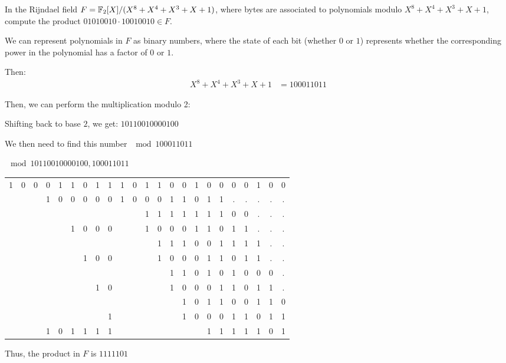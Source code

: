 \begin{problem}
In the Rijndael field $F=\mathbb{F}_2[X]/(X^8+X^4+X^3+X+1)$,
where bytes are associated to polynomials modulo $X^8+X^4+X^3+X+1$,
compute the product $01010010 \cdot 10010010 \in F$.
\end{problem}

\begin{Answer}

We can represent polynomials in $F$ as binary numbers,
where the state of each bit (whether $0$ or $1$) represents whether the
corresponding power in the polynomial has a factor of $0$ or $1$.

\noindent
Then:
\begin{align*}
  X^8+X^4+X^3+X+1 &= 100011011
\end{align*}

\noindent
Then, we can perform the multiplication modulo 2:
\bigskip
\center{}

\flushleft{}
Shifting back to base $2$, we get:
$1 0 1 1 0 0 1 0 0 0 0 1 0 0$

\noindent
We then need to find this number $\mod 100011011$

\center{}
$\mod{1 0 1 1 0 0 1 0 0 0 0 1 0 0},{1 0 0 0 1 1 0 1 1}$

\begin{tabular}{c@{\,}c@{\,}c@{\,}c@{\,}c@{\,}c@{\,}c@{\,}c@{\,}c@{\,}|c@{\,}c@{\,}c@{\,}c@{\,}c@{\,}c@{\,}c@{\,}c@{\,}c@{\,}c@{\,}c@{\,}c@{\,}c@{\,}c@{\,}}
  1 & 0 & 0 & 0 & 1 & 1 & 0 & 1 & 1    & 1 & 0 & 1 & 1 & 0 & 0 & 1 & 0 & 0 & 0 & 0 & 1 & 0 & 0\\
    &   &   & 1 & 0 & 0 & 0 & 0 & 0    & 1 & 0 & 0 & 0 & 1 & 1 & 0 & 1 & 1 &.  &.  &.  &.  &. \\
    &   &   &   &   &   &   &   &      &   &   & 1 & 1 & 1 & 1 & 1 & 1 & 1 & 0 & 0 &.  &.  &. \\
    &   &   &   &   & 1 & 0 & 0 & 0    &   &   & 1 & 0 & 0 & 0 & 1 & 1 & 0 & 1 & 1 &.  &.  &. \\
    &   &   &   &   &   &   &   &      &   &   &   & 1 & 1 & 1 & 0 & 0 & 1 & 1 & 1 & 1 &.  &. \\
    &   &   &   &   &   & 1 & 0 & 0    &   &   &   & 1 & 0 & 0 & 0 & 1 & 1 & 0 & 1 & 1 &.  &. \\
    &   &   &   &   &   &   &   &      &   &   &   &   & 1 & 1 & 0 & 1 & 0 & 1 & 0 & 0 & 0 &. \\
    &   &   &   &   &   &   & 1 & 0    &   &   &   &   & 1 & 0 & 0 & 0 & 1 & 1 & 0 & 1 & 1 &. \\
    &   &   &   &   &   &   &   &      &   &   &   &   &   & 1 & 0 & 1 & 1 & 0 & 0 & 1 & 1 & 0\\
    &   &   &   &   &   &   &   & 1    &   &   &   &   &   & 1 & 0 & 0 & 0 & 1 & 1 & 0 & 1 & 1\\
\hline{}
    &   &   & 1 & 0 & 1 & 1 & 1 & 1    &   &   &   &   &   &   &   & 1 & 1 & 1 & 1 & 1 & 0 & 1\\
\end{tabular}

\flushleft{}
\noindent
Thus, the product in $F$ is $1 1 1 1 1 0 1$
\end{Answer}
